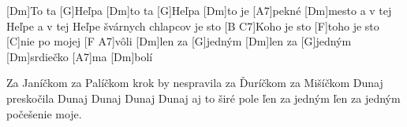 
[Dm]To ta [G]Heľpa [Dm]to ta [G]Heľpa
[Dm]to je [A7]pekné [Dm]mesto
a v tej Heľpe a v tej Heľpe
švárnych chlapcov je sto
[B C7]Koho je sto [F]toho je sto
[C]nie po mojej [F A7]vôli
[Dm]len za [G]jedným [Dm]len za [G]jedným
[Dm]srdiečko [A7]ma [Dm]bolí

Za Janíčkom za Palíčkom krok by nespravila
za Ďuríčkom za Mišíčkom Dunaj preskočila
Dunaj Dunaj Dunaj Dunaj aj to širé pole
ľen za jedným ľen za jedným počešenie moje.

